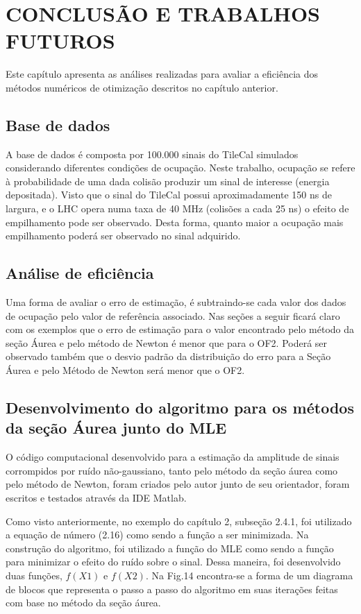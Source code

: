 \chapter{CONCLUSÃO E TRABALHOS FUTUROS}

Este capítulo apresenta as análises realizadas para avaliar a eficiência dos métodos numéricos de otimização descritos no capítulo anterior.

\section{Base de dados}
A base de dados é composta por 100.000 sinais do TileCal simulados considerando diferentes condições de ocupação. Neste trabalho, ocupação se refere à probabilidade de uma dada colisão produzir um sinal de interesse (energia depositada). Visto que o sinal do TileCal possui aproximadamente 150 ns de largura, e o LHC opera numa taxa de 40 MHz (colisões a cada 25 ns) o efeito de empilhamento pode ser observado. Desta forma, quanto maior a ocupação mais empilhamento poderá ser observado no sinal adquirido.

\section{Análise de eficiência}
\label{amplitude}
Uma forma de avaliar o erro de estimação, é subtraindo-se cada valor dos dados de ocupação pelo valor de referência associado. Nas seções a seguir ficará claro com os exemplos que o erro de estimação para o valor encontrado pelo método da seção Áurea e pelo método de Newton é menor que para o OF2. Poderá ser observado também que o desvio padrão da distribuição do erro para a Seção Áurea e pelo Método de Newton será menor que o OF2.

\section{Desenvolvimento do algoritmo para os métodos da seção Áurea junto do MLE}
\label{algoritmoMLE}

O código computacional desenvolvido para a estimação da amplitude de sinais corrompidos por ruído não-gaussiano, tanto pelo método da seção áurea como pelo método de Newton, foram criados pelo autor junto de seu orientador, foram escritos e testados através da IDE Matlab.

Como visto anteriormente, no exemplo do capítulo 2, subseção 2.4.1, foi utilizado a equação de número (2.16) como sendo a função a ser minimizada. Na construção do algoritmo, foi utilizado a função do MLE como sendo a função para minimizar o efeito do ruído sobre o sinal. Dessa maneira, foi desenvolvido duas funções, $f(X1)$ e $f(X2)$. Na Fig.14 encontra-se a forma de um diagrama de blocos que representa o passo a passo do algoritmo em suas iterações feitas com base no método da seção áurea.


